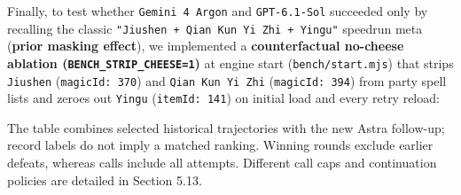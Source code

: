 \documentclass[11pt,a4paper]{article}
\begin{document}
Finally, to test whether \texttt{Gemini\allowbreak{} \allowbreak{}4\allowbreak{} \allowbreak{}Argon} and \texttt{GPT\allowbreak{}-\allowbreak{}6\allowbreak{}.\allowbreak{}1\allowbreak{}-\allowbreak{}Sol} succeeded only by recalling the classic \texttt{"Jiushen\allowbreak{} \allowbreak{}+\allowbreak{} \allowbreak{}Qian\allowbreak{} \allowbreak{}Kun\allowbreak{} \allowbreak{}Yi\allowbreak{} \allowbreak{}Zhi\allowbreak{} \allowbreak{}+\allowbreak{} \allowbreak{}Yingu"} speedrun meta (\textbf{prior masking effect}), we implemented a \textbf{counterfactual no-cheese ablation (\texttt{BENCH\allowbreak{}\_\allowbreak{}STRIP\allowbreak{}\_\allowbreak{}CHEESE\allowbreak{}=\allowbreak{}1})} at engine start (\texttt{bench\allowbreak{}/\allowbreak{}start\allowbreak{}.\allowbreak{}mjs}) that strips \texttt{Jiushen} (\texttt{magicId\allowbreak{}:\allowbreak{} \allowbreak{}370}) and \texttt{Qian\allowbreak{} \allowbreak{}Kun\allowbreak{} \allowbreak{}Yi\allowbreak{} \allowbreak{}Zhi} (\texttt{magicId\allowbreak{}:\allowbreak{} \allowbreak{}394}) from party spell lists and zeroes out \texttt{Yingu} (\texttt{itemId\allowbreak{}:\allowbreak{} \allowbreak{}141}) on initial load and every retry reload:

The table combines selected historical trajectories with the new Astra follow-up; record labels do not imply a matched ranking. Winning rounds exclude earlier defeats, whereas calls include all attempts. Different call caps and continuation policies are detailed in Section 5.13.
\end{document}
